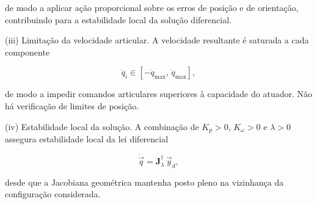 de modo a aplicar ação proporcional sobre os erros de posição e de orientação, contribuindo para a estabilidade local da solução diferencial.

(iii) Limitação da velocidade articular.  
A velocidade resultante é saturada a cada componente

\begin{equation}
\dot{q}_{i}
\in
[-\dot{q}_{\max},\,\dot{q}_{\max}],
\end{equation}

de modo a impedir comandos articulares superiores à capacidade do atuador. Não há verificação de limites de posição.

(iv) Estabilidade local da solução.  
A combinação de $K_{p}>0$, $K_{\omega}>0$ e $\lambda>0$ assegura estabilidade local da lei diferencial

\begin{equation}
\dot{\vec{q}}
=
\mathbf{J}_{\lambda}^{\dagger}\,\vec{y}_{d},
\end{equation}

desde que a Jacobiana geométrica mantenha posto pleno na vizinhança da configuração considerada.